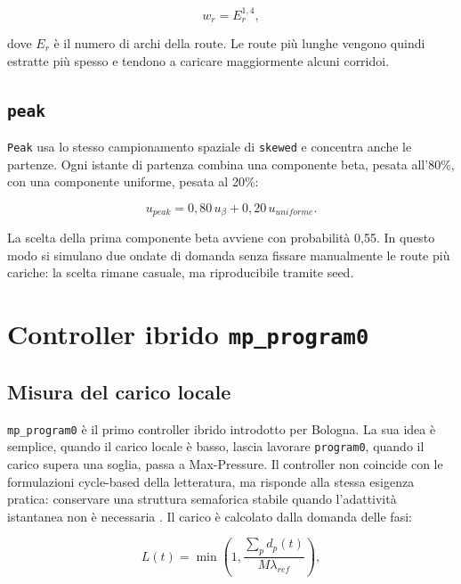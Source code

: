 \documentclass[12pt,a4paper,oneside]{report}
\numberwithin{equation}{chapter}
\begin{document}
\begin{equation}
    w_r=E_r^{1{,}4},
    \label{eq:route-weight}
\end{equation}

dove $E_r$ è il numero di archi della route. Le route più lunghe vengono quindi
estratte più spesso e tendono a caricare maggiormente alcuni corridoi.

\subsection{\texttt{peak}}

\texttt{Peak} usa lo stesso campionamento spaziale di \texttt{skewed} e
concentra anche le partenze. Ogni istante di partenza combina una componente
beta, pesata all'80\%, con una componente uniforme, pesata al 20\%:

\begin{equation}
    u_{peak}=0{,}80\,u_{\beta}+0{,}20\,u_{uniforme}.
    \label{eq:peak-mixture}
\end{equation}

La scelta della prima componente beta avviene con probabilità 0,55. In questo
modo si simulano due ondate di domanda senza fissare manualmente le route più
cariche: la scelta rimane casuale, ma riproducibile tramite seed.

\section{Controller ibrido \texttt{mp\_program0}}
\label{sec:mp-program0}

\subsection{Misura del carico locale}

\texttt{mp\_program0} è il primo controller ibrido introdotto per Bologna. La
sua idea è semplice, quando il carico locale è basso, lascia lavorare
\texttt{program0}, quando il carico supera una soglia, passa a Max-Pressure. Il
controller non coincide con le formulazioni cycle-based della letteratura, ma
risponde alla stessa esigenza pratica: conservare una struttura semaforica
stabile quando l'adattività istantanea non è necessaria
\cite{anderson2018cyclebased,levin2020cyclical}. Il carico è calcolato dalla
domanda delle fasi:

\begin{equation}
    L(t)=\min\left(1,\frac{\sum_p d_p(t)}{M\lambda_{ref}}\right),
    \label{eq:program0-load}
\end{equation}
\end{document}
